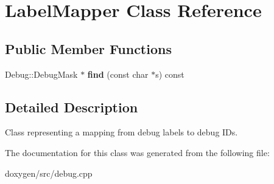 \hypertarget{class_label_mapper}{}\section{Label\+Mapper Class Reference}
\label{class_label_mapper}
\subsection*{Public Member Functions}
\begin{DoxyCompactItemize}
\item 
\mbox{\label{class_label_mapper_a1df28a586770946523d178451dbc5abb}} 
Debug\+::\+Debug\+Mask $\ast$ {\bfseries find} (const char $\ast$s) const
\end{DoxyCompactItemize}


\subsection{Detailed Description}
Class representing a mapping from debug labels to debug I\+Ds. 

The documentation for this class was generated from the following file\+:\begin{DoxyCompactItemize}
\item 
doxygen/src/debug.\+cpp\end{DoxyCompactItemize}
